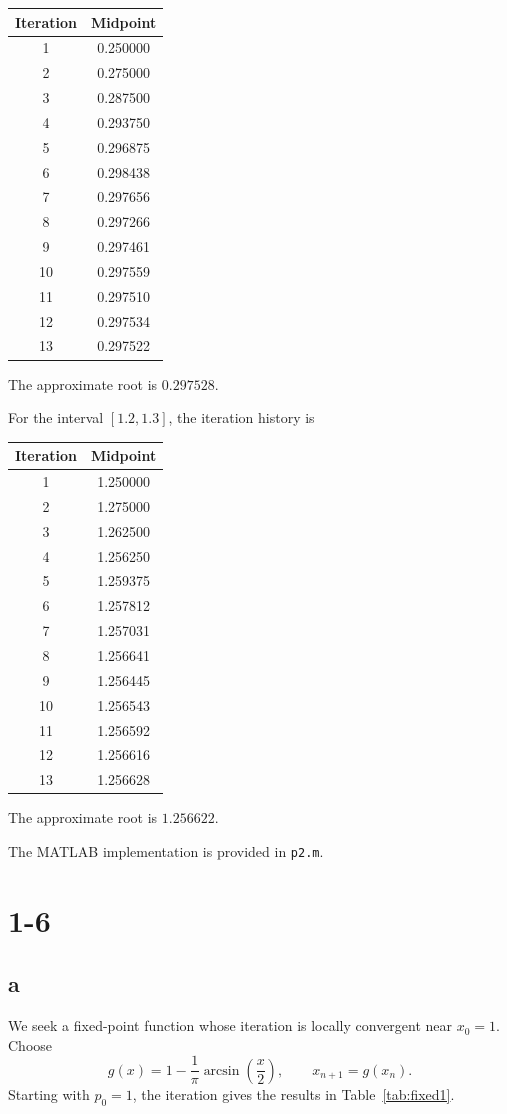 \documentclass[11pt,a4paper]{report}
\theoremstyle{remark}
\begin{document}
\begin{center}
\begin{tabular}{cc}
\hline
Iteration & Midpoint\\
\hline
1 & 0.250000\\
2 & 0.275000\\
3 & 0.287500\\
4 & 0.293750\\
5 & 0.296875\\
6 & 0.298438\\
7 & 0.297656\\
8 & 0.297266\\
9 & 0.297461\\
10 & 0.297559\\
11 & 0.297510\\
12 & 0.297534\\
13 & 0.297522\\
\hline
\end{tabular}
\end{center}
The approximate root is $0.297528$.

For the interval $[1.2,1.3]$, the iteration history is
\begin{center}
\begin{tabular}{cc}
\hline
Iteration & Midpoint\\
\hline
1 & 1.250000\\
2 & 1.275000\\
3 & 1.262500\\
4 & 1.256250\\
5 & 1.259375\\
6 & 1.257812\\
7 & 1.257031\\
8 & 1.256641\\
9 & 1.256445\\
10 & 1.256543\\
11 & 1.256592\\
12 & 1.256616\\
13 & 1.256628\\
\hline
\end{tabular}
\end{center}
The approximate root is $1.256622$.

The MATLAB implementation is provided in \texttt{p2.m}.

\section*{1-6}
\subsection*{a}
We seek a fixed-point function whose iteration is locally convergent near $x_0=1$. Choose
\[
g(x)=1-\frac{1}{\pi}\arcsin\!\left(\frac{x}{2}\right),
\qquad x_{n+1}=g(x_n).
\]
Starting with $p_0=1$, the iteration gives the results in Table~\ref{tab:fixed1}.
\end{document}

